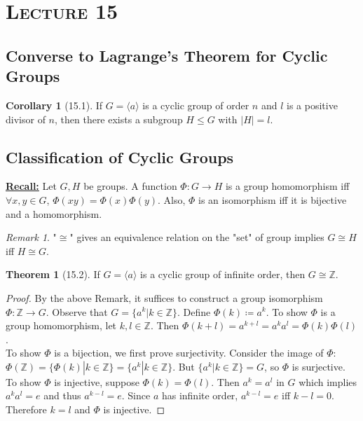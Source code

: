 \documentclass{article}
\newcommand{\Z}{\mathbb{Z}}
\newcommand{\coleq}{\coloneqq}
\newcommand{\define}[1]{\textbf{\underline{#1}}}
\newcommand{\func}[3]{#1: #2 \to #3}
\newcommand{\gen}[1]{\langle#1\rangle}
\theoremstyle{definition}
\newtheorem*{cor}{Corollary}
\newtheorem*{thm}{Theorem}
\theoremstyle{remark}
\newtheorem*{rmk}{Remark}
\begin{document}
    \noindent\section*{\textbf{\textsc{Lecture 15}}}{
        \subsection*{Converse to Lagrange's Theorem for Cyclic Groups}{
            \begin{cor}[15.1]
                If $G=\gen{a}$ is a cyclic group of order $n$ and $l$ is a positive divisor of $n$, then there exists a subgroup $H\leq G$ with $|H|=l$.
            \end{cor}
        }
        \subsection*{Classification of Cyclic Groups}{
            \define{Recall:} Let $G,H$ be groups. A function $\func{\Phi}{G}{H}$ is a group homomorphism iff $\forall x,y \in G$, $\Phi(xy)=\Phi(x)\Phi(y)$. Also, $\Phi$ is an isomorphism iff it is bijective and a homomorphism.
            
            \begin{rmk}
                "$\cong$" gives an equivalence relation on the "set" of group implies $G\cong H$ iff $H \cong G$.
            \end{rmk}
            
            \begin{thm}[15.2]
                If $G=\gen{a}$ is a cyclic group of infinite order, then $G \cong \Z$.
            \end{thm}
            
            \begin{proof}
                By the above Remark, it suffices to construct a group isomorphism $\func{\Phi}{\Z}{G}$. Observe that $G=\{a^k|k\in \Z\}$. Define $\Phi(k)\coleq a^k$. To show $\Phi$ is a group homomorphism, let $k,l \in \Z$. Then $\Phi(k+l)=a^{k+l}=a^ka^l=\Phi(k)\Phi(l)$.\\
                To show $\Phi$ is a bijection, we first prove surjectivity. Consider the image of $\Phi$: $\Phi(\Z)=\{\Phi(k)|k \in \Z\}=\{a^k|k \in \Z\}$. But $\{a^k|k \in \Z\}=G$, so $\Phi$ is surjective.\\
                To show $\Phi$ is injective, suppose $\Phi(k)=\Phi(l)$. Then $a^k=a^l$ in $G$ which implies $a^ka^l=e$ and thus $a^{k-l}=e$. Since $a$ has infinite order, $a^{k-l}=e$ iff $k-l=0$. Therefore $k=l$ and $\Phi$ is injective.
            \end{proof}
            
}}
\end{document}
